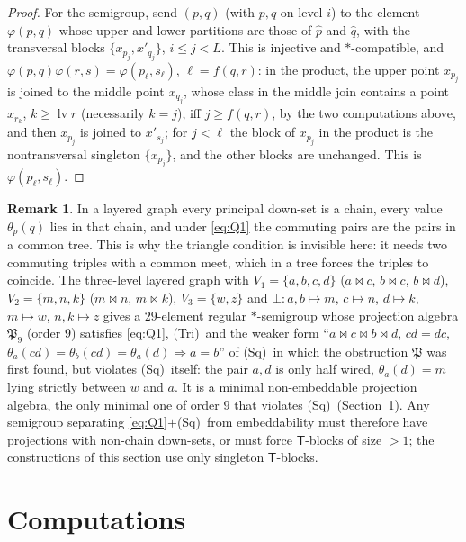 \documentclass[11pt]{amsart}
\theoremstyle{definition}
\newtheorem{remark}[theorem]{Remark}
\newcommand{\T}{\mathsf{T}}
\newcommand{\mt}{\bowtie}      %
\newcommand{\Tri}{\textup{(Tri)}}
\newcommand{\Wire}{\textup{(Sq)}}      %
\begin{document}
\begin{proof}
For the semigroup, send $(p,q)$ (with $p,q$ on level $i$) to the element $\varphi(p,q)$ whose upper and lower partitions are those of $\hat p$ and $\hat q$, with the transversal blocks $\{x_{p_j},x'_{q_j}\}$, $i\le j<L$. This is injective and $*$-compatible, and $\varphi(p,q)\varphi(r,s)=\varphi(p_\ell,s_\ell)$, $\ell=f(q,r)$: in the product, the upper point $x_{p_j}$ is joined to the middle point $x_{q_j}$, whose class in the middle join contains a point $x_{r_k}$, $k\ge\operatorname{lv}r$ (necessarily $k=j$), iff $j\ge f(q,r)$, by the two computations above, and then $x_{p_j}$ is joined to $x'_{s_j}$; for $j<\ell$ the block of $x_{p_j}$ in the product is the nontransversal singleton $\{x_{p_j}\}$, and the other blocks are unchanged. This is $\varphi(p_\ell,s_\ell)$.
\end{proof}

\begin{remark}\label{rem:layered}
In a layered graph every principal down-set is a chain, every value $\theta_p(q)$ lies in that chain, and under \eqref{eq:Q1} the commuting pairs are the pairs in a common tree. This is why the triangle condition is invisible here: it needs two commuting triples with a common meet, which in a tree forces the triples to coincide. The three-level layered graph with $V_1=\{a,b,c,d\}$ ($a\mt c$, $b\mt c$, $b\mt d$), $V_2=\{m,n,k\}$ ($m\mt n$, $m\mt k$), $V_3=\{w,z\}$ and $\bot\colon a,b\mapsto m$, $c\mapsto n$, $d\mapsto k$, $m\mapsto w$, $n,k\mapsto z$ gives a $29$-element regular $*$-semigroup whose projection algebra $\mathfrak P_9$ (order $9$) satisfies \eqref{eq:Q1}, \Tri\ and the weaker form ``$a\mt c\mt b\mt d$, $cd=dc$, $\theta_a(cd)=\theta_b(cd)=\theta_a(d)\Rightarrow a=b$'' of \Wire\ in which the obstruction $\mathfrak P$ was first found, but violates \Wire\ itself: the pair $a,d$ is only half wired, $\theta_a(d)=m$ lying strictly between $w$ and $a$. It is a minimal non-embeddable projection algebra, the only minimal one of order $9$ that violates \Wire\ (Section~\ref{sec:comp}). Any semigroup separating \eqref{eq:Q1}$+$\Wire\ from embeddability must therefore have projections with non-chain down-sets, or must force $\T$-blocks of size $>1$; the constructions of this section use only singleton $\T$-blocks.
\end{remark}

\section{Computations}\label{sec:comp}
\end{document}
